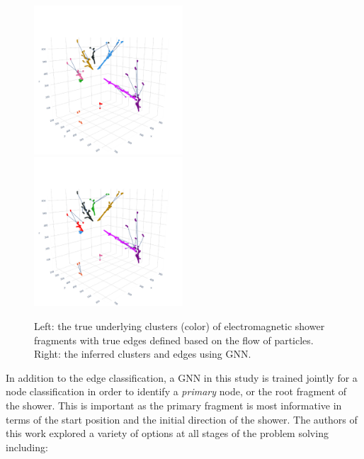 \documentclass{ws-rv9x6}
\begin{document}
\begin{figure}[t]
    \centering
    \includegraphics[width=0.495\textwidth,trim=1cm 0cm 1cm 3cm, clip]{figures/event_11512_label.pdf}
    \includegraphics[width=0.495\textwidth,trim=1cm 0cm 1cm 3cm, clip]{figures/event_11512_pred.pdf}
    \caption{Left: the true underlying clusters (color) of electromagnetic shower fragments with true edges defined based on the flow of particles. Right: the inferred clusters and edges using GNN. }
    \label{fig:clustering:gnn_output}
\end{figure}
In addition to the edge classification, a GNN in this study is trained jointly for a node classification in order to identify a {\it primary} node, or the root fragment of the shower. This is important as the primary fragment is most informative in terms of the start position and the initial direction of the shower. The authors of this work explored a variety of options at all stages of the problem solving including:
\end{document}
